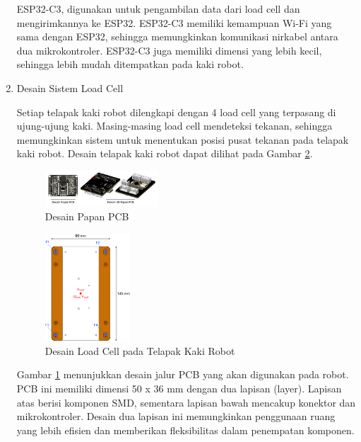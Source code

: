 \begin{enumerate}[label=\Alph*.]
    \hspace*{1em} ESP32-C3, digunakan untuk pengambilan data dari load cell dan mengirimkannya ke ESP32. ESP32-C3 memiliki kemampuan Wi-Fi yang sama dengan ESP32, sehingga memungkinkan komunikasi nirkabel antara dua mikrokontroler. ESP32-C3 juga memiliki dimensi yang lebih kecil, sehingga lebih mudah ditempatkan pada kaki robot. 

    \item Desain Sistem Load Cell
    \label{subsec:desainsistemloadcell}

    \hspace*{1em} Setiap telapak kaki robot dilengkapi dengan 4 load cell yang terpasang di ujung-ujung kaki. Masing-masing load cell mendeteksi tekanan, sehingga memungkinkan sistem untuk menentukan posisi pusat tekanan pada telapak kaki robot. Desain telapak kaki robot dapat dilihat pada Gambar \ref{fig:Dia_LoadCell}.
    
    \begin{figure} [h] \centering
      \includegraphics[width=0.4\textwidth]{gambar/Desain_PCB.png}
      \caption{Desain Papan PCB}
      \label{fig:Desain_PCB}
    \end{figure}

    \begin{figure} [h] \centering
        \includegraphics[width=0.3\textwidth]{gambar/Diagram_LoadCell.png}
        \caption{Desain Load Cell pada Telapak Kaki Robot}
        \label{fig:Dia_LoadCell}
    \end{figure}

    \hspace*{1em} Gambar \ref{fig:Desain_PCB} menunjukkan desain jalur PCB yang akan digunakan pada robot. PCB ini memiliki dimensi 50 x 36 mm dengan dua lapisan (layer). Lapisan atas berisi komponen SMD, sementara lapisan bawah mencakup konektor dan mikrokontroler. Desain dua lapisan ini memungkinkan penggunaan ruang yang lebih efisien dan memberikan fleksibilitas dalam penempatan komponen.  
    

\end{enumerate}
